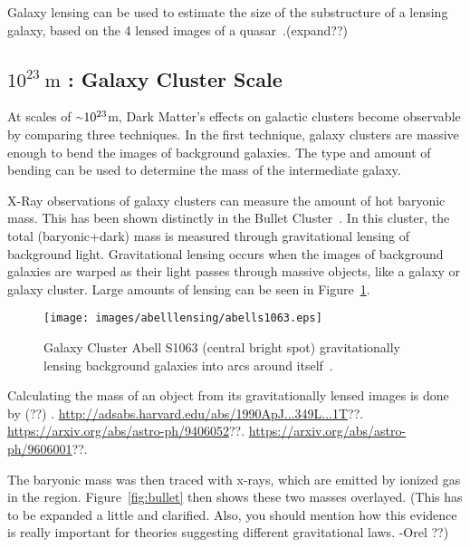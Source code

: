     
    Galaxy lensing can be used to estimate the size of the substructure of a lensing galaxy, based on the 4 lensed images of a quasar~\cite{weak_lensing_quasar}.{\color{red}(expand??)}


  \subsection{$10^{23}\:\text{m}$ : Galaxy Cluster Scale}
    At scales of $\nicetilde 10^{23}$m, Dark Matter's effects on galactic clusters become observable by comparing three techniques.
    In the first technique, galaxy clusters are massive enough to bend the images of background galaxies.
    The type and amount of bending can be used to determine the mass of the intermediate galaxy.

    X-Ray observations of galaxy clusters can measure the amount of hot baryonic mass.
    This has been shown distinctly in the Bullet Cluster~\cite{bullet_cluster}.
    In this cluster, the total (baryonic+dark) mass is measured through gravitational lensing of background light.
    Gravitational lensing occurs when the images of background galaxies are warped as their light passes through massive objects, like a galaxy or galaxy cluster.
    Large amounts of lensing can be seen in Figure~\ref{fig:abelllensing}.
    
    \begin{figure}[ht]
      \centering
      \texttt{[image: images/abelllensing/abells1063.eps]}
      \caption[Abell S1063 Lensing]{
        Galaxy Cluster Abell S1063 (central bright spot) gravitationally lensing background galaxies into arcs around itself~\cite{abelllensing,clusterimages}.
      }
      \label{fig:abelllensing}
    \end{figure}
    
    Calculating the mass of an object from its gravitationally lensed images is done by {\color{red}(??)} \cite{}.
    {\color{red}\url{http://adsabs.harvard.edu/abs/1990ApJ...349L...1T}??}.
    {\color{red}\url{https://arxiv.org/abs/astro-ph/9406052}??}.
    {\color{red}\url{https://arxiv.org/abs/astro-ph/9606001}??}.
    
    The baryonic mass was then traced with x-rays, which are emitted by ionized gas in the region.
    Figure~\ref{fig:bullet} then shows these two masses overlayed.
    {\color{red}(This has to be expanded a little and clarified. Also, you should mention how this evidence is really important for theories suggesting different gravitational laws. -Orel ??)}

